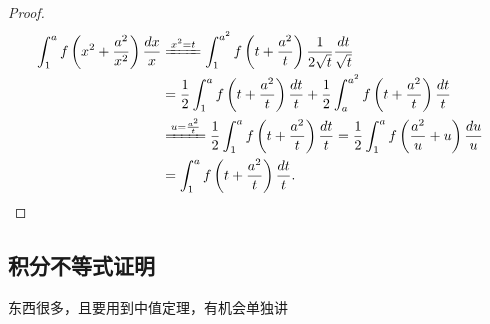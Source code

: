 \begin{proof}
\begin{align*}
\int_{1}^{a} f\left(x^2 + \frac{a^2}{x^2}\right) \frac{dx}{x} 
&\xlongequal{x^2=t} \int_{1}^{a^2} f\left(t + \frac{a^2}{t}\right) \frac{1}{2\sqrt{t}} \frac{dt}{\sqrt{t}} \\
&= \frac{1}{2} \int_{1}^{a} f\left(t + \frac{a^2}{t}\right) \frac{dt}{t} + \frac{1}{2} \int_{a}^{a^2} f\left(t + \frac{a^2}{t}\right) \frac{dt}{t} \\
&\xlongequal{u= \frac{a^2}{t}} \frac{1}{2} \int_{1}^{a} f\left(t + \frac{a^2}{t}\right) \frac{dt}{t} = \frac{1}{2} \int_{1}^{a} f\left(\frac{a^2}{u} + u\right) \frac{du}{u} \\
&= \int_{1}^{a} f\left(t + \frac{a^2}{t}\right) \frac{dt}{t}.
\end{align*}
\end{proof}



\subsection{积分不等式证明}
东西很多，且要用到中值定理，有机会单独讲



\newpage




